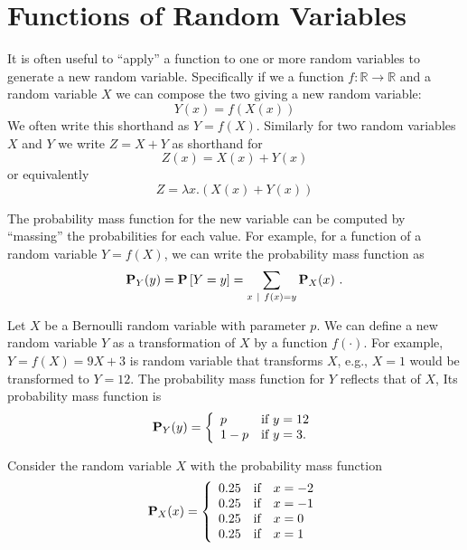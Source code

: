 \section{Functions of Random Variables}
\label{sec:probability::randvar::functionsof}

\begin{flex}

    It is often useful to ``apply'' a function to one or more random
    variables to generate a new random variable.   Specifically if we a
    function $f : \mathbb{R} \rightarrow \mathbb{R}$ and
    a random variable $X$ we can compose the two giving a new
    random variable:
    \[Y(x) = f(X(x)) \]
    We often write this shorthand as $Y = f(X)$.
    Similarly for two random variables $X$ and $Y$
    we write $Z = X + Y$ as shorthand for 
        \[Z(x) = X(x) + Y(x) \]
    or equivalently
        \[Z = \lambda x . (X(x) + Y(x)) \]

%
The probability mass function for the new variable can be computed by
``massing'' the probabilities for each value.
%
For example, for a function of a random variable $Y = f(X)$, we can
write the probability mass function as 
\[
\mathbf{P}_{Y}(y) = \mathbf{P}\left[{Y = y}\right] = \sum_{x ~\mid~ f(x) = y}{\mathbf{P}_{X}(x)}~.
\]
%


\begin{example}
Let $X$ be a Bernoulli random variable with parameter $p$.  We can
define a new random variable $Y$ as a transformation of $X$ by a
function $f(\cdot)$.  For example, $Y = f(X) = 9X + 3$ is random
variable that transforms $X$, e.g., $X = 1$ would be transformed to $Y
= 12$.
%
The probability mass function for $Y$ reflects that of $X$,
%
Its probability mass function is 
\[
\mathbf{P}_{Y}(y) = 
\left\{
\begin{array}{ll}
p & \mbox{if}~y = 12
\\
1-p & \mbox{if}~y = 3.
\end{array}
\right.
\]

\end{example}

\begin{example}
Consider the random variable $X$ with the probability mass function 
\[
\mathbf{P}_{X}(x) = 
\left\{
\begin{array}{lll}
0.25  & \mbox{if} & x = -2
\\
0.25  & \mbox{if} & x = -1
\\
0.25  & \mbox{if} & x = 0
\\
0.25  & \mbox{if} & x = 1
\end{array}
\right.
\]


\end{example}
\end{flex}
